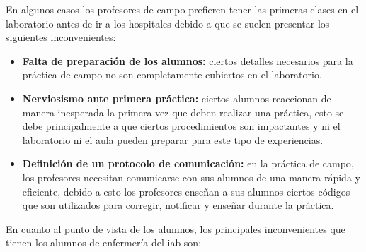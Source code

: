 En algunos casos los profesores de campo prefieren tener las primeras clases en
el laboratorio antes de ir a los hospitales debido a que se suelen presentar los
siguientes inconvenientes:

\begin{itemize}

    \item \textbf{Falta de preparación de los alumnos:} ciertos detalles
        necesarios para la práctica de campo no son completamente cubiertos en
        el laboratorio.

    \item \textbf{Nerviosismo ante primera práctica:} ciertos alumnos reaccionan
        de manera inesperada la primera vez que deben realizar una práctica,
        esto se debe principalmente a que ciertos procedimientos son impactantes
        y ni el laboratorio ni el aula pueden preparar para este tipo de
        experiencias.
                
    \item \textbf{Definición de un protocolo de comunicación:} en la práctica de
        campo, los profesores necesitan comunicarse con sus alumnos de una
        manera rápida y eficiente, debido a esto los profesores enseñan a sus
        alumnos ciertos códigos que son utilizados para corregir, notificar y
        enseñar durante la práctica.
          
\end{itemize}


En cuanto al punto de vista de los alumnos, los principales inconvenientes que
tienen los alumnos de enfermería del \Gls{iab} son:

